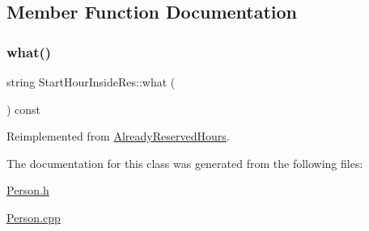 \subsection{Member Function Documentation}
\mbox{\label{class_start_hour_inside_res_a90b45cf2a2d4f0adcf7d9f650bee1574}} 
\subsubsection{\texorpdfstring{what()}{what()}}
{\footnotesize\ttfamily string Start\+Hour\+Inside\+Res\+::what (\begin{DoxyParamCaption}{ }\end{DoxyParamCaption}) const\hspace{0.3cm}{\ttfamily [virtual]}}



Reimplemented from \mbox{\hyperlink{class_already_reserved_hours_a69081ef7e75aa68b9aa5c75d02fe2194}{Already\+Reserved\+Hours}}.



The documentation for this class was generated from the following files\+:\begin{DoxyCompactItemize}
\item 
\mbox{\hyperlink{_person_8h}{Person.\+h}}\item 
\mbox{\hyperlink{_person_8cpp}{Person.\+cpp}}\end{DoxyCompactItemize}
